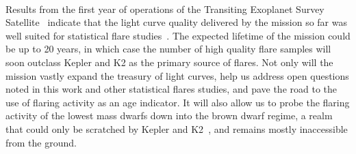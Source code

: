\documentclass{aa}
\begin{document}
\\
Results from the first year of operations of the Transiting Exoplanet Survey Satellite~\citep{ricker2014} indicate that the light curve quality delivered by the mission so far was well suited for statistical flare studies~\citep{doyle2020,guenther2020}. The expected lifetime of the mission could be up to 20 years, in which case the number of high quality flare samples will soon outclass Kepler and K2 as the primary source of flares. Not only will the mission vastly expand the treasury of light curves, help us address open questions noted in this work and other statistical flares studies, and pave the road to the use of flaring activity as an age indicator. It will also allow us to probe the flaring activity of the lowest mass dwarfs down into the brown dwarf regime, a realm that could only be scratched by Kepler and K2~\citep{gizis2013, paudel2018}, and remains mostly inaccessible from the ground.
\end{document}
